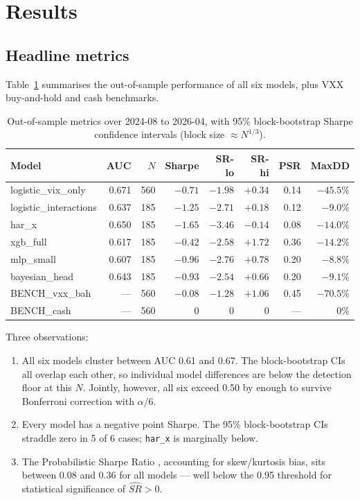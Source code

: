 \documentclass[11pt,a4paper]{article}
\begin{document}
\section{Results}

\subsection{Headline metrics}

Table~\ref{tab:headline} summarises the out-of-sample performance of all six models, plus VXX buy-and-hold and cash benchmarks.

\begin{table}[h]
\centering
\caption{Out-of-sample metrics over 2024-08 to 2026-04, with 95\% block-bootstrap Sharpe confidence intervals (block size $\approx N^{1/3}$).}
\label{tab:headline}
\small
\begin{tabular}{lrrrrrrr}
\toprule
Model & AUC & $N$ & Sharpe & SR-lo & SR-hi & PSR & MaxDD \\
\midrule
logistic\_vix\_only       & 0.671 & 560 & $-0.71$ & $-1.98$ & $+0.34$ & 0.14 & $-45.5\%$ \\
logistic\_interactions    & 0.637 & 185 & $-1.25$ & $-2.71$ & $+0.18$ & 0.12 & $-9.0\%$ \\
har\_x                    & 0.650 & 185 & $-1.65$ & $-3.46$ & $-0.14$ & 0.08 & $-14.0\%$ \\
xgb\_full                 & 0.617 & 185 & $-0.42$ & $-2.58$ & $+1.72$ & 0.36 & $-14.2\%$ \\
mlp\_small                & 0.607 & 185 & $-0.96$ & $-2.76$ & $+0.78$ & 0.20 & $-8.8\%$ \\
bayesian\_head            & 0.643 & 185 & $-0.93$ & $-2.54$ & $+0.66$ & 0.20 & $-9.1\%$ \\
\midrule
BENCH\_vxx\_bah           & ---    & 560 & $-0.08$ & $-1.28$ & $+1.06$ & 0.45 & $-70.5\%$ \\
BENCH\_cash               & ---    & 560 & 0      & 0      & 0      & ---    & 0\% \\
\bottomrule
\end{tabular}
\end{table}

Three observations:
\begin{enumerate}
    \item All six models cluster between AUC 0.61 and 0.67. The block-bootstrap CIs all overlap each other, so individual model differences are below the detection floor at this $N$. Jointly, however, all six exceed 0.50 by enough to survive Bonferroni correction with $\alpha / 6$.
    \item Every model has a negative point Sharpe. The 95\% block-bootstrap CIs straddle zero in 5 of 6 cases; \verb|har_x| is marginally below.
    \item The Probabilistic Sharpe Ratio \cite{baileylopezdeprado2014}, accounting for skew/kurtosis bias, sits between 0.08 and 0.36 for all models --- well below the 0.95 threshold for statistical significance of $\hat{SR} > 0$.
\end{enumerate}
\end{document}
